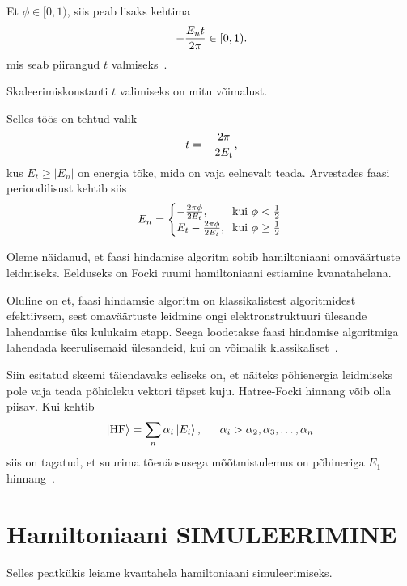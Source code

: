 \documentclass[12pt]{report}
\def\abs#1{\left|#1\right|}
\def\ket#1{\mathinner{|#1\rangle}}
\begin{document}
Et \(\phi \in [0, 1)\), siis peab lisaks kehtima
\begin{align}
    -\frac{E_n t}{2\pi} \in [0, 1) \rlap{.}
\end{align}
mis seab piirangud \(t\) valmiseks~\cite{whitfield+etal}.

Skaleerimiskonstanti \(t\) valimiseks on mitu võimalust.

Selles töös on tehtud valik
\begin{align}
    t = -\frac{2\pi}{2E_\mathrm{t}} \rlap{,}
\end{align}
kus \(E_t \ge \abs{E_n}\) on energia tõke, mida on vaja eelnevalt teada.
Arvestades faasi perioodilisust kehtib siis
\begin{align}
    E_n = \begin{cases}
        -\frac{2\pi\phi}{2E_t}\rlap{,} & \text{kui } \phi < \frac{1}{2} \\
        E_t - \frac{2\pi\phi}{2E_t}\rlap{,} & \text{kui } \phi \ge \frac{1}{2} \\
    \end{cases}
\end{align}

Oleme näidanud, et faasi hindamise algoritm sobib hamiltoniaani omaväärtuste leidmiseks.
Eelduseks on Focki ruumi hamiltoniaani estiamine kvanatahelana.

Oluline on et, faasi hindamsie algoritm on klassikalistest algoritmidest efektiivsem, sest omaväärtuste leidmine ongi elektronstruktuuri ülesande lahendamise üks kulukaim etapp.
Seega loodetakse faasi hindamise algoritmiga lahendada keerulisemaid ülesandeid, kui on võimalik klassikaliset~\cite{mcardle+etal, cao+etal}.

Siin esitatud skeemi täiendavaks eeliseks on, et näiteks põhienergia leidmiseks pole vaja teada põhioleku vektori täpset kuju.
Hatree-Focki hinnang võib olla piisav.
Kui kehtib
\begin{align}
    \ket{\text{HF}} = \sum_n \alpha_i \ket{E_i} \rlap{,}
    \qquad \alpha_i > \alpha_2, \alpha_3, \ldots, \alpha_n
\end{align}
siis on tagatud, et suurima tõenäosusega mõõtmistulemus on põhineriga \(E_1\) hinnang~\cite{whitfield+etal}.


\section{Hamiltoniaani SIMULEERIMINE}\label{sec:qcirc}

Selles peatkükis leiame kvantahela hamiltoniaani simuleerimiseks.
\end{document}
